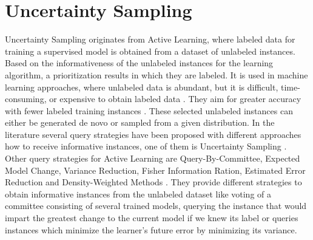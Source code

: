 \section{Uncertainty Sampling} 
\label{sec:uncertaintysampling}

 




Uncertainty Sampling originates from Active Learning, 
where labeled data for training a supervised model is obtained from a dataset of unlabeled instances.
Based on the informativeness of the unlabeled instances for the learning algorithm, a prioritization results in which they are labeled.
It is used in machine learning approaches, where unlabeled data is abundant, but it is difficult, time-consuming, or expensive to obtain labeled data \cite{Settles2009ActiveLL}.
They aim for greater accuracy with fewer labeled training instances \cite{Settles2009ActiveLL}.
These selected unlabeled instances can either be generated de novo or sampled from a given distribution.
In the literature several query strategies have been proposed with different approaches how to receive informative instances, one of them is Uncertainty Sampling \cite{Settles2009ActiveLL}.
Other query strategies for Active Learning are Query-By-Committee, Expected Model Change, Variance Reduction, Fisher Information Ration, Estimated Error Reduction and Density-Weighted Methods \cite{Settles2009ActiveLL}.
They provide different strategies to obtain informative instances from the unlabeled dataset like voting of a committee consisting of several trained models, querying the instance that would impart the greatest change to the current model if we knew its label or queries instances which minimize the learner’s future error by minimizing its variance.

